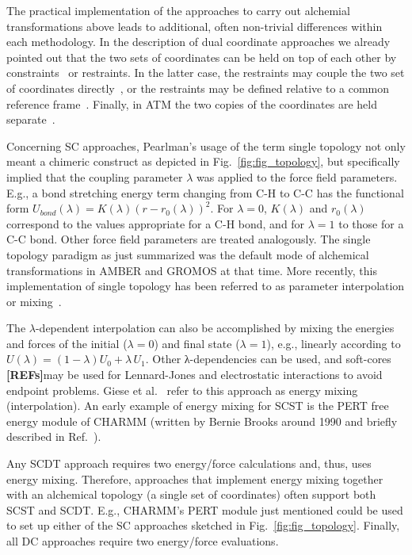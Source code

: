 \documentclass[9pt,bestpractices]{livecoms}
\newcommand{\rref}{{\bfseries[REFs]}{}}
\begin{document}
The practical implementation of the approaches to carry out alchemial transformations above leads to additional, often non-trivial differences within each methodology. In the description of dual coordinate approaches we already pointed out that the two sets of coordinates can be held on top of each other by constraints~\cite{jiang2019computing,lee2023aces} or restraints. In the latter case, the restraints may couple the two set of coordinates directly~\cite{Axelsen_1998,Ries_2022}, or the restraints may be defined relative to a common reference frame~\cite{rocklin2013separated,Baumann_2023}. Finally, in ATM the two copies of the coordinates are held separate~\cite{azimi2022relative}.

Concerning SC approaches, Pearlman’s usage of the term single topology not only meant a chimeric construct as depicted in Fig.~\ref{fig:fig_topology}, but specifically implied that the coupling parameter $\lambda$ was applied to the force field parameters. E.g., a bond stretching energy term changing from C-H to C-C has the functional form $U_{bond}(\lambda)=K(\lambda)(r-r_0(\lambda))^2$. For $\lambda=0$, $K(\lambda)$ and $r_0(\lambda)$ correspond to the values appropriate for a C-H bond, and for $\lambda=1$ to those for a C-C bond. Other force field parameters are treated analogously. The single topology paradigm as just summarized was the default mode of alchemical transformations in AMBER and GROMOS at that time.  More recently, this implementation of single topology has been referred to as parameter interpolation or mixing~\cite{Giese_2018}. 

The $\lambda$-dependent interpolation can also be accomplished by mixing the energies and forces of the initial ($\lambda=0$) and final state ($\lambda=1$), e.g., linearly according to $U(\lambda)=(1-\lambda) U_0+\lambda\,U_1$. Other λ-dependencies can be used, and soft-cores \rref may be used for Lennard-Jones and electrostatic interactions to avoid endpoint problems. Giese et al.~\cite{Giese_2018} refer to this approach as energy mixing (interpolation).%
An early example of energy mixing for SCST is the PERT free energy module of CHARMM (written by Bernie Brooks around 1990 and briefly described in Ref.~\cite{brooks_2009}).

Any SCDT approach requires two energy/force calculations and, thus, uses energy mixing. Therefore, approaches that implement energy mixing together with an alchemical topology (a single set of coordinates) often support both SCST and SCDT. E.g., CHARMM's PERT module just mentioned could be used to set up either of the SC approaches sketched in Fig.~\ref{fig:fig_topology}. Finally, all DC approaches require two energy/force evaluations.
\end{document}
